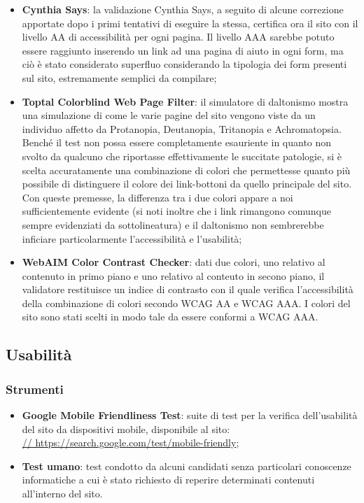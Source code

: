 \documentclass[12pt]{article}
\begin{document}
\begin{itemize}
		\item \textbf{Cynthia Says}: la validazione Cynthia Says, a seguito di alcune correzione apportate dopo i primi tentativi di eseguire la stessa, certifica ora il sito con il livello AA di accessibilità per ogni pagina. Il livello AAA sarebbe potuto essere raggiunto inserendo un link ad una pagina di aiuto in ogni form, ma ciò è stato considerato superfluo considerando la tipologia dei form presenti sul sito, estremamente semplici da compilare;
		\item \textbf{Toptal Colorblind Web Page Filter}: il simulatore di daltonismo mostra una simulazione di come le varie pagine del sito vengono viste da un individuo affetto da Protanopia, Deutanopia, Tritanopia e Achromatopsia. Benché il test non possa essere completamente esauriente in quanto non svolto da qualcuno che riportasse effettivamente le succitate patologie, si è scelta accuratamente una combinazione di colori che permettesse quanto più possibile di distinguere il colore dei link-bottoni da quello principale del sito. Con queste premesse, la differenza tra i due colori appare a noi sufficientemente evidente (si noti inoltre che i link rimangono comunque sempre evidenziati da sottolineatura) e il daltonismo non sembrerebbe inficiare particolarmente l'accessibilità e l'usabilità;
		\item \textbf{WebAIM Color Contrast Checker}: dati due colori, uno relativo al contenuto in primo piano e uno relativo al conteuto in secono piano, il validatore restituisce un indice di contrasto con il quale verifica l'accessibilità della combinazione di colori secondo WCAG AA e WCAG AAA. I colori del sito sono stati scelti in modo tale da essere conformi a WCAG AAA. 
	\end{itemize}
	
	\subsection{Usabilità}
	
	\subsubsection{Strumenti}
	
	\begin{itemize}
		\item \textbf{Google Mobile Friendliness Test}: suite di test per la verifica dell'usabilità del sito da dispositivi mobile, disponibile al sito:
		\\ \url{// https://search.google.com/test/mobile-friendly};
		
		\item \textbf{Test umano}: test condotto da alcuni candidati senza particolari conoscenze informatiche a cui è stato richiesto di reperire determinati contenuti all'interno del sito.
	\end{itemize}
\end{document}
